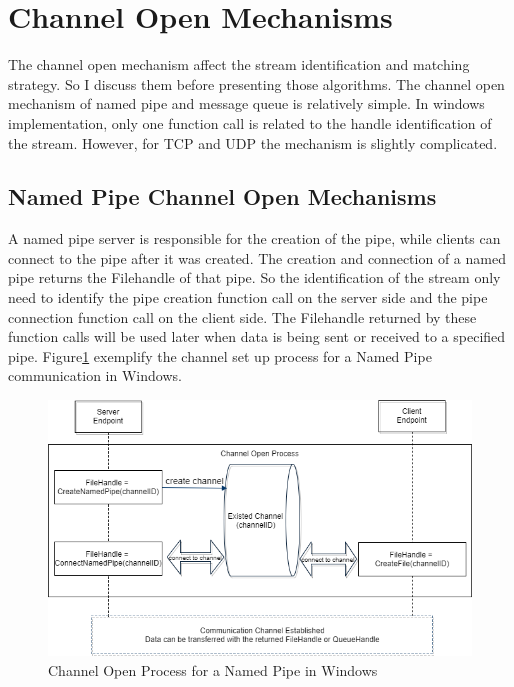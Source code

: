 \section{Channel Open Mechanisms}
The channel open mechanism affect the stream identification and matching strategy. So I discuss them before presenting those algorithms. The channel open mechanism of named pipe and message queue is relatively simple. In windows implementation, only one function call is related to the handle identification of the stream. However, for TCP and UDP the mechanism is slightly complicated.

\subsection{Named Pipe Channel Open Mechanisms} 
A named pipe server is responsible for the creation of the pipe, while clients can connect to the pipe after it was created. The creation and connection of a named pipe returns the Filehandle of that pipe. So the identification of the stream only need to identify the pipe creation function call on the server side and the pipe connection function call on the client side. The Filehandle returned by these function calls will be used later when data is being sent or received to a specified pipe. Figure\ref{namedpipeopen} exemplify the channel set up process for a Named Pipe communication in Windows. 

\begin{figure}[H]
\centerline{\includegraphics[scale=0.55]{Figures/namepipechannelopen}}
 \caption{Channel Open Process for a Named Pipe in Windows}
\label{namedpipeopen}
\end{figure}
    
